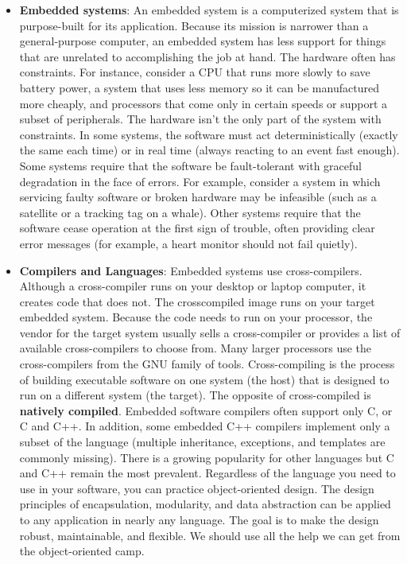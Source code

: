 \documentclass{report}
\begin{document}
    \begin{itemize}
        \item \textbf{Embedded systems}: An embedded system is a computerized system that is purpose-built for its application.
            \bigbreak \noindent 
            Because its mission is narrower than a general-purpose computer, an embedded system has less support for things that are unrelated to accomplishing the job at hand. The hardware often has constraints. For instance, consider a CPU that runs more slowly to save battery power, a system that uses less memory so it can be manufactured more cheaply, and processors that come only in certain speeds or support a subset of peripherals.
            \bigbreak \noindent 
            The hardware isn’t the only part of the system with constraints. In some systems, the software must act deterministically (exactly the same each time) or in real time (always reacting to an event fast enough). Some systems require that the software be fault-tolerant with graceful degradation in the face of errors. For example, consider a system in which servicing faulty software or broken hardware may be infeasible (such as a satellite or a tracking tag on a whale). Other systems require that the software cease operation at the first sign of trouble, often providing clear error messages (for example, a heart monitor should not fail quietly).
        \item \textbf{Compilers and Languages}: Embedded systems use cross-compilers. Although a cross-compiler runs on your desktop or laptop computer, it creates code that does not. The crosscompiled image runs on your target embedded system. Because the code needs to run on your processor, the vendor for the target system usually sells a cross-compiler or provides a list of available cross-compilers to choose from. Many larger processors use the cross-compilers from the GNU family of tools.
            \bigbreak \noindent 
            Cross-compiling is the process of building executable software on one system (the host) that is designed to run on a different system (the target). The opposite of cross-compiled is \textbf{natively compiled}.
            \bigbreak \noindent 
            Embedded software compilers often support only C, or C and C++. In addition, some embedded C++ compilers implement only a subset of the language (multiple inheritance, exceptions, and templates are commonly missing). There is a growing popularity for other languages but C and C++ remain the most prevalent.
            \bigbreak \noindent 
            Regardless of the language you need to use in your software, you can practice object-oriented design. The design principles of encapsulation, modularity, and data abstraction can be applied to any application in nearly any language. The goal is to make the design robust, maintainable, and flexible. We should use all the help we can get from the object-oriented camp.

\end{itemize}
\end{document}

